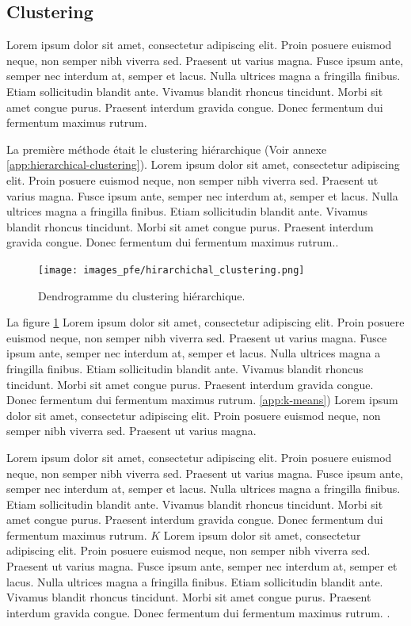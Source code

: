 \subsection{Clustering}
Lorem ipsum dolor sit amet, consectetur adipiscing elit. Proin posuere euismod neque, non semper nibh viverra sed. Praesent ut varius magna. Fusce ipsum ante, semper nec interdum at, semper et lacus. Nulla ultrices magna a fringilla finibus. Etiam sollicitudin blandit ante. Vivamus blandit rhoncus tincidunt. Morbi sit amet congue purus. Praesent interdum gravida congue. Donec fermentum dui fermentum maximus rutrum.

\medskip

La première méthode était le clustering hiérarchique (Voir annexe \ref{app:hierarchical-clustering}). Lorem ipsum dolor sit amet, consectetur adipiscing elit. Proin posuere euismod neque, non semper nibh viverra sed. Praesent ut varius magna. Fusce ipsum ante, semper nec interdum at, semper et lacus. Nulla ultrices magna a fringilla finibus. Etiam sollicitudin blandit ante. Vivamus blandit rhoncus tincidunt. Morbi sit amet congue purus. Praesent interdum gravida congue. Donec fermentum dui fermentum maximus rutrum..

\begin{figure}[hbt!]
  \centering
  \texttt{[image: images\_pfe/hirarchichal\_clustering.png]}
  \caption{Dendrogramme du clustering hiérarchique.}
  \label{fig:hierarchical-clustering}
\end{figure}
\FloatBarrier

La figure \ref{fig:hierarchical-clustering} Lorem ipsum dolor sit amet, consectetur adipiscing elit. Proin posuere euismod neque, non semper nibh viverra sed. Praesent ut varius magna. Fusce ipsum ante, semper nec interdum at, semper et lacus. Nulla ultrices magna a fringilla finibus. Etiam sollicitudin blandit ante. Vivamus blandit rhoncus tincidunt. Morbi sit amet congue purus. Praesent interdum gravida congue. Donec fermentum dui fermentum maximus rutrum. \ref{app:k-means}) Lorem ipsum dolor sit amet, consectetur adipiscing elit. Proin posuere euismod neque, non semper nibh viverra sed. Praesent ut varius magna.

\medskip

Lorem ipsum dolor sit amet, consectetur adipiscing elit. Proin posuere euismod neque, non semper nibh viverra sed. Praesent ut varius magna. Fusce ipsum ante, semper nec interdum at, semper et lacus. Nulla ultrices magna a fringilla finibus. Etiam sollicitudin blandit ante. Vivamus blandit rhoncus tincidunt. Morbi sit amet congue purus. Praesent interdum gravida congue. Donec fermentum dui fermentum maximus rutrum. $K$ Lorem ipsum dolor sit amet, consectetur adipiscing elit. Proin posuere euismod neque, non semper nibh viverra sed. Praesent ut varius magna. Fusce ipsum ante, semper nec interdum at, semper et lacus. Nulla ultrices magna a fringilla finibus. Etiam sollicitudin blandit ante. Vivamus blandit rhoncus tincidunt. Morbi sit amet congue purus. Praesent interdum gravida congue. Donec fermentum dui fermentum maximus rutrum. \parencite{kassambara_determining_nodate}.


